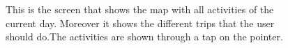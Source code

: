 \documentclass[12pt,titlepage]{article}
\begin{document}
\begin{figure}
\centering
{}
\caption{This is the screen that shows the map with all activities of the current day. Moreover it shows the different trips that the user should do.The activities are shown through a tap on the pointer.}
\end{figure}
\end{document}
